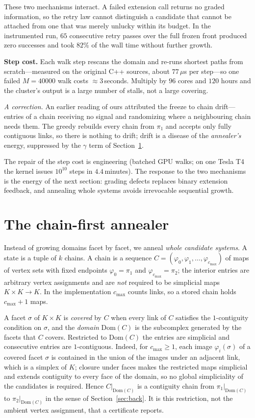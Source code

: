 \documentclass[12pt]{article}
\begin{document}
These two mechanisms interact.  A failed extension call returns no
graded information, so the retry law cannot distinguish a candidate
that cannot be attached from one that was merely unlucky within its
budget.  In the instrumented run, $65$ consecutive retry passes over
the full frozen front produced zero successes and took $82\%$ of the
wall time without further growth.

\textbf{Step cost.}  Each walk step rescans the domain and re-runs
shortest paths from scratch---measured on the original C++ sources,
about $77\,\mu$s per step---so one failed $M{=}40000$ walk costs
${\approx}3$\,seconds.  Multiply by $96$ cores and $120$ hours and the
cluster's output is a large number of stalls, not a large covering.

\emph{A correction.}  An earlier reading of ours attributed the freeze
to chain drift---entries of a chain receiving no signal and randomizing
where a neighbouring chain needs them.  The greedy rebuilds every chain
from $\pi_1$ and accepts only fully contiguous links, so there is
nothing to drift; drift is a disease of the \emph{annealer's} energy,
suppressed by the $\gamma$ term of Section~\ref{sec:annealer}.

The repair of the step cost is engineering (batched GPU walks; on one
Tesla T4 the kernel issues $10^{10}$ steps in $4.4$\,minutes).  The
response to the two mechanisms is the energy of the next section:
grading defects replaces binary extension feedback, and annealing whole
systems avoids irrevocable sequential growth.

\section{The chain-first annealer}\label{sec:annealer}

Instead of growing domains facet by facet, we anneal \emph{whole
candidate systems}.  A state is a tuple of $k$ chains.  A chain is a
sequence $C=(\varphi_0,\varphi_1,\dots,\varphi_{c_{\max}})$ of maps of
vertex sets with fixed endpoints $\varphi_0=\pi_1$ and
$\varphi_{c_{\max}}=\pi_2$; the interior entries are arbitrary vertex
assignments and are \emph{not} required to be simplicial maps
$K\times K\to K$.  In the implementation $c_{\max}$ counts links, so a
stored chain holds $c_{\max}+1$ maps.

A facet $\sigma$ of $K\times K$ is \emph{covered} by $C$ when every
link of $C$ satisfies the $1$-contiguity condition on $\sigma$, and the
\emph{domain} $\mathrm{Dom}(C)$ is the subcomplex generated by the
facets that $C$ covers.  Restricted to $\mathrm{Dom}(C)$ the entries
are simplicial and consecutive entries are $1$-contiguous.  Indeed, for
$c_{\max}\ge1$, each image $\varphi_i(\sigma)$ of a covered facet
$\sigma$ is contained in the union of the images under an adjacent
link, which is a simplex of $K$; closure under faces makes the
restricted maps simplicial and extends contiguity to every face of the
domain, so no global simpliciality of the candidates is required.
Hence $C|_{\mathrm{Dom}(C)}$ is a contiguity chain from
$\pi_1|_{\mathrm{Dom}(C)}$ to $\pi_2|_{\mathrm{Dom}(C)}$ in the sense
of Section~\ref{sec:back}.  It is this restriction, not the ambient
vertex assignment, that a certificate reports.
\end{document}
